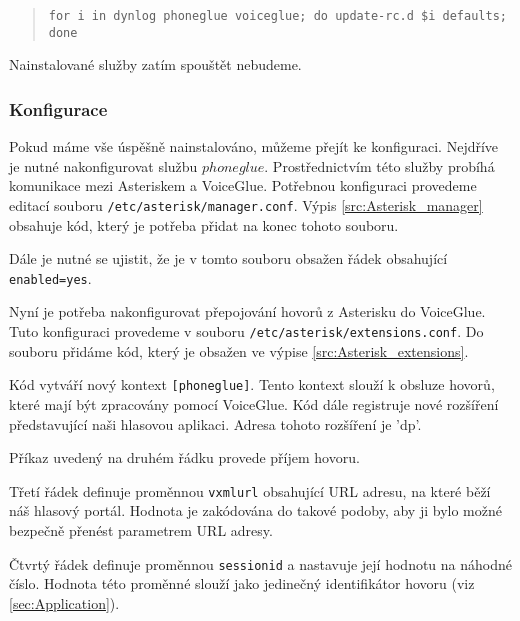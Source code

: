 \documentclass[ing,male,java,dept460]{diploma}						%
\begin{document}
\begin{quote}
\begin{sloppypar}
	\texttt{for i in dynlog phoneglue voiceglue; do update-rc.d \$i defaults; done}
\end{sloppypar}
\end{quote}

Nainstalované služby zatím spouštět nebudeme.

\subsubsection{Konfigurace}
Pokud máme vše úspěšně nainstalováno, můžeme přejít ke konfiguraci. Nejdříve je nutné nakonfigurovat službu $phoneglue$. Prostřednictvím této služby probíhá komunikace mezi Asteriskem a VoiceGlue. Potřebnou konfiguraci provedeme editací souboru \texttt{/etc/asterisk/manager.conf}. Výpis \ref{src:Asterisk_manager} obsahuje kód, který je potřeba přidat na konec tohoto souboru.



Dále je nutné se ujistit, že je v tomto souboru obsažen řádek obsahující \texttt{enabled=yes}.

Nyní je potřeba nakonfigurovat přepojování hovorů z Asterisku do VoiceGlue. Tuto konfiguraci provedeme v souboru \texttt{/etc/asterisk/extensions.conf}. Do souboru přidáme kód, který je obsažen ve výpise \ref{src:Asterisk_extensions}.



Kód vytváří nový kontext \texttt{[phoneglue]}. Tento kontext slouží k obsluze hovorů, které mají být zpracovány pomocí VoiceGlue. Kód dále registruje nové rozšíření představující naši hlasovou aplikaci. Adresa tohoto rozšíření je 'dp'.

Příkaz uvedený na druhém řádku provede příjem hovoru.

Třetí řádek definuje proměnnou \texttt{vxmlurl} obsahující URL adresu, na které běží náš hlasový portál. Hodnota je zakódována do takové podoby, aby ji bylo možné bezpečně přenést parametrem URL adresy.

Čtvrtý řádek definuje proměnnou \texttt{sessionid} a nastavuje její hodnotu na náhodné číslo. Hodnota této proměnné slouží jako jedinečný identifikátor hovoru (viz \ref{sec:Application}).
\end{document}
